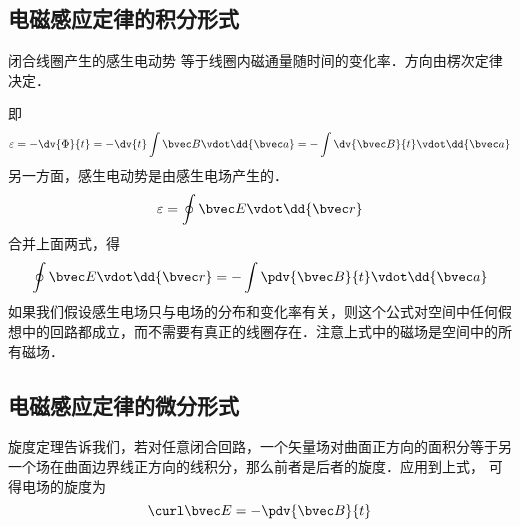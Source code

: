 

\subsection{电磁感应定律的积分形式}

闭合线圈产生的感生电动势%
等于线圈内磁通量随时间的变化率．方向由楞次定律%
决定．

即
\begin{equation}
\varepsilon  =  -\dv{\Phi}{t} =  - \dv{t} \int \bvec B \vdot \dd{\bvec a} =  - \int \dv{\bvec B}{t} \vdot \dd{\bvec a}
\end{equation} 
另一方面，感生电动势是由感生电场产生的． 
\begin{equation}
\varepsilon  = \oint \bvec E \vdot \dd{\bvec r}
\end{equation} 
合并上面两式，得
\begin{equation}
\oint \bvec E \vdot \dd{\bvec r}  =  - \int \pdv{\bvec B}{t} \vdot \dd{\bvec a} 
\end{equation} 
如果我们假设感生电场只与电场的分布和变化率有关，则这个公式对空间中任何假想中的回路都成立，而不需要有真正的线圈存在．注意上式中的磁场是空间中的所有磁场． 
\subsection{电磁感应定律的微分形式}

旋度定理告诉我们，若对任意闭合回路，一个矢量场对曲面正方向的面积分等于另一个场在曲面边界线正方向的线积分，那么前者是后者的旋度．应用到上式， 可得电场的旋度为
\begin{equation}
\curl \bvec E =  - \pdv{\bvec B}{t}
\end{equation} 

